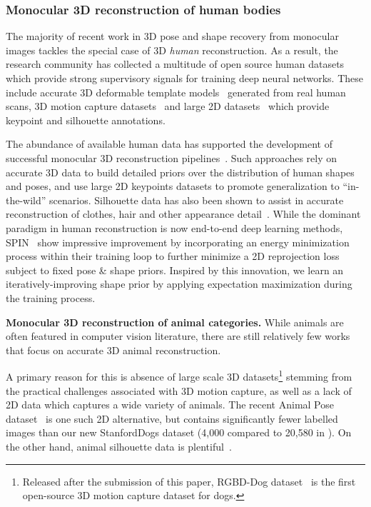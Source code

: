 \subsubsection{Monocular 3D reconstruction of human bodies}
The majority of recent work in 3D pose and shape recovery from monocular images tackles the special case of 3D \emph{human} reconstruction. As a result, the research community has collected a multitude of open source human datasets which provide strong supervisory signals for training deep neural networks. These include accurate 3D deformable template models~\cite{loper15smpl} generated from real human scans, 3D motion capture datasets~\cite{ionescu2013human3,vonmarcard2018recovering} and large 2D datasets~\cite{lin2014microsoft,johnson2010clustered,andriluka14cvpr} which provide keypoint and silhouette annotations. 

The abundance of available human data has supported the development of successful monocular 3D reconstruction pipelines~\cite{kolotouros19convolutional,kanazawa18end-to-end}. Such approaches rely on accurate 3D data to build detailed priors over the distribution of human shapes and poses, and use large 2D keypoints datasets to promote generalization to ``in-the-wild'' scenarios. Silhouette data has also been shown to assist in accurate reconstruction of clothes, hair and other appearance detail~\cite{pifuSHNMKL19,alldieck2019learning}.
While the dominant paradigm in human reconstruction is now end-to-end deep learning methods, SPIN~\cite{kolotouros19learning} show impressive improvement by incorporating an energy minimization process within their training loop to further minimize a 2D reprojection loss subject to fixed pose \& shape priors. Inspired by this innovation, we learn an iteratively-improving shape prior by applying expectation maximization during the training process.

\textbf{Monocular 3D reconstruction of animal categories.}
While animals are often featured in computer vision literature, there are still relatively few works that focus on accurate 3D animal reconstruction. 

A primary reason for this is absence of large scale 3D datasets\footnote{Released after the submission of this paper, RGBD-Dog dataset~\cite{Kearney_2020_CVPR} is the first open-source 3D motion capture dataset for dogs.} stemming from the practical challenges associated with 3D motion capture, as well as a lack of 2D data which captures a wide variety of animals. The recent Animal Pose dataset~\cite{animalpose} is one such 2D alternative, but contains significantly fewer labelled images than our new StanfordDogs dataset (4,000 compared to 20,580 in ). 
On the other hand, animal silhouette data is plentiful~\cite{lin2014microsoft,everingham2010pascal,DAVIS2017-2nd}.

